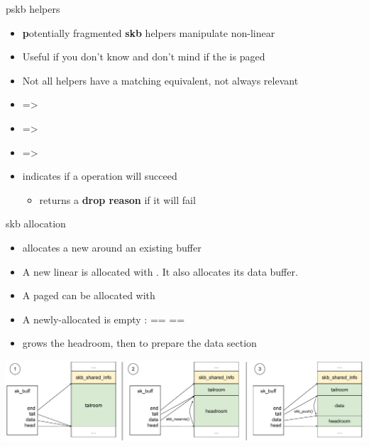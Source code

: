 \begin{frame}{pskb helpers}
	\begin{itemize}
		\item \textbf{p}otentially fragmented \textbf{skb} helpers manipulate non-linear 
		\item Useful if you don't know and don't mind if the  is paged
		\item Not all helpers have a matching  equivalent, not always relevant
		\item {} => 
		\item {} => 
		\item {} => 
		\item {} indicates if a  operation will succeed
			\begin{itemize}
				\item {} returns a \textbf{drop reason} if it will fail
			\end{itemize}
	\end{itemize}
\end{frame}

\begin{frame}{skb allocation}
	\begin{itemize}
		\item {} allocates a new  around an existing buffer
		\item A new linear  is allocated with . It also allocates its data buffer.
		\item A paged  can be allocated with 
		\item A newly-allocated  is empty :  ==  == 
		\item {} grows the headroom, then  to prepare the data section
	\end{itemize}
	\includegraphics[width=\textwidth]{slides/networking-skb/newskb.pdf}
\end{frame}


